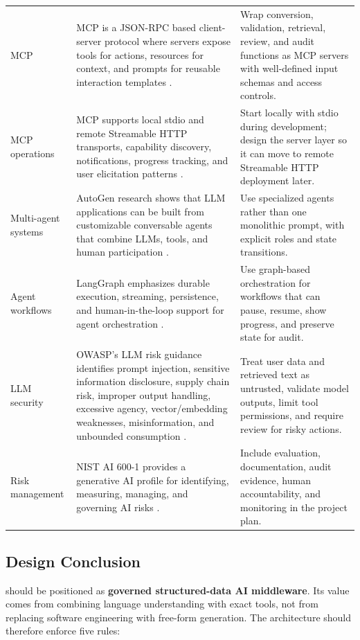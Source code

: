 \begin{longtable}{p{}p{}p{}}
\addlinespace
MCP & MCP is a JSON-RPC based client-server protocol where servers expose tools for actions, resources for context, and prompts for reusable interaction templates \cite{mcpArchitecture,mcpLatest}. & Wrap conversion, validation, retrieval, review, and audit functions as MCP servers with well-defined input schemas and access controls. \\
\addlinespace
MCP operations & MCP supports local stdio and remote Streamable HTTP transports, capability discovery, notifications, progress tracking, and user elicitation patterns \cite{mcpArchitecture}. & Start locally with stdio during development; design the server layer so it can move to remote Streamable HTTP deployment later. \\
\addlinespace
Multi-agent systems & AutoGen research shows that LLM applications can be built from customizable conversable agents that combine LLMs, tools, and human participation \cite{wu2023autogen}. & Use specialized agents rather than one monolithic prompt, with explicit roles and state transitions. \\
\addlinespace
Agent workflows & LangGraph emphasizes durable execution, streaming, persistence, and human-in-the-loop support for agent orchestration \cite{langgraphDocs}. & Use graph-based orchestration for workflows that can pause, resume, show progress, and preserve state for audit. \\
\addlinespace
LLM security & OWASP's LLM risk guidance identifies prompt injection, sensitive information disclosure, supply chain risk, improper output handling, excessive agency, vector/embedding weaknesses, misinformation, and unbounded consumption \cite{owaspLLM}. & Treat user data and retrieved text as untrusted, validate model outputs, limit tool permissions, and require review for risky actions. \\
\addlinespace
Risk management & NIST AI 600-1 provides a generative AI profile for identifying, measuring, managing, and governing AI risks \cite{nistAI600}. & Include evaluation, documentation, audit evidence, human accountability, and monitoring in the project plan. \\
\bottomrule
\end{longtable}

\subsection{Design Conclusion}

\projectname{} should be positioned as \textbf{governed structured-data AI middleware}. Its value comes from combining language understanding with exact tools, not from replacing software engineering with free-form generation. The architecture should therefore enforce five rules:

